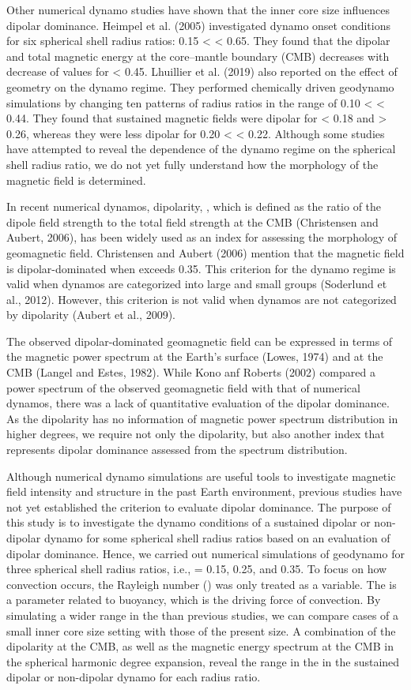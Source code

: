 Other numerical dynamo studies have shown that the inner core size influences dipolar dominance. Heimpel et al. (2005) investigated dynamo onset conditions for six spherical shell radius ratios: 0.15 <  < 0.65. They found that the dipolar and total magnetic energy at the core–mantle boundary (CMB) decreases with decrease of  values for  < 0.45. Lhuillier et al. (2019) also reported on the effect of geometry on the dynamo regime. They performed chemically driven geodynamo simulations by changing ten patterns of radius ratios in the range of 0.10 <  < 0.44. They found that sustained magnetic fields were dipolar for  < 0.18 and  > 0.26, whereas they were less dipolar for 0.20 <  < 0.22. Although some studies have attempted to reveal the dependence of the dynamo regime on the spherical shell radius ratio, we do not yet fully understand how the morphology of the magnetic field is determined.

In recent numerical dynamos, dipolarity, , which is defined as the ratio of the dipole field strength to the total field strength at the CMB (Christensen and Aubert, 2006), has been widely used as an index for assessing the morphology of geomagnetic field. Christensen and Aubert (2006) mention that the magnetic field is dipolar-dominated when  exceeds 0.35. This criterion for the dynamo regime is valid when dynamos are categorized into large and small  groups (Soderlund et al., 2012). However, this criterion is not valid when dynamos are not categorized by dipolarity (Aubert et al., 2009). 

The observed dipolar-dominated geomagnetic field can be expressed in terms of the magnetic power spectrum at the Earth’s surface (Lowes, 1974) and at the CMB (Langel and Estes, 1982). While Kono anf Roberts (2002) compared a power  spectrum of the observed geomagnetic field with that of numerical dynamos, there was a lack of quantitative evaluation of the dipolar dominance. As the dipolarity has no information of magnetic power spectrum distribution in higher degrees, we require not only the dipolarity, but also another index that represents dipolar dominance assessed from the spectrum distribution.

Although numerical dynamo simulations are useful tools to investigate magnetic field intensity and structure in the past Earth environment, previous studies have not yet established the criterion to evaluate dipolar dominance. The purpose of this study is to investigate the dynamo conditions of a sustained dipolar or non-dipolar dynamo for some spherical shell radius ratios based on an evaluation of dipolar dominance. Hence, we carried out numerical simulations of geodynamo for three spherical shell radius ratios, i.e.,  = 0.15, 0.25, and 0.35. To focus on how convection occurs, the Rayleigh number () was only treated as a variable. The  is a parameter related to buoyancy, which is the driving force of convection. By simulating a wider range in the  than previous studies, we can compare cases of a small inner core size setting with those of the present size. A combination of the dipolarity at the CMB, as well as the magnetic energy spectrum at the CMB in the spherical harmonic degree expansion, reveal the range in the  in the sustained dipolar or non-dipolar dynamo for each radius ratio.

